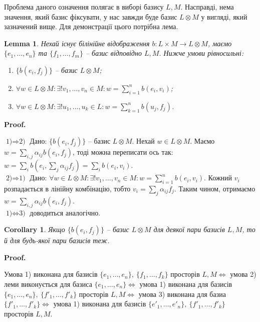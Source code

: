 \documentclass[a4paper, 10pt]{article}
\makeatletter
\theoremstyle{theoremdd}
\newtheorem{lemma}[theorem]{Lemma}
\newtheorem{corollary}[theorem]{Corollary}
\renewenvironment{proof}[1][Proof.\\]{\par
\pushQED{\hfill \qed}%
\normalfont \topsep6\p@\@plus6\p@\relax
\trivlist
\item\relax
{\bfseries
#1\@addpunct{.}}\hspace\labelsep\ignorespaces
}{%
\popQED\endtrivlist\@endpefalse
}
\makeatother
\begin{document}
\noindent
Проблема даного означення полягає в виборі базису $L,M$. Насправді, нема значення, який базис фіксувати, у нас завжди буде базис $L \otimes M$ у вигляді, який зазначений вище. Для демонстрації цього потрібна лема.

\begin{lemma}
Нехай існує білінійне відображення $b \colon L \times M \to L \otimes M$, маємо $\{e_1,\dots,e_n\}$ та $\{f_1,\dots,f_m\}$ -- базис відповідно $L,M$. Нижче умови рівносильні:
\begin{enumerate}[nosep,wide=0pt,label={\arabic*)}]
\item $\{b(e_i,f_j)\}$ -- базис $L \otimes M$;
\item $\forall w \in L \otimes M: \exists ! v_1,\dots,v_n \in M: w = \displaystyle\sum_{i=1}^n b(e_i,v_i)$;
\item $\forall w \in L \otimes M: \exists ! u_1,\dots,u_k \in L: w = \displaystyle\sum_{k=1}^n b(u_j,f_j)$.
\end{enumerate}
\end{lemma}

\begin{proof}
$\boxed{\text{1)} \Rightarrow \text{2)}}$ Дано: $\{b(e_i,f_j)\}$ -- базис $L \otimes M$. Нехай $w \in L \otimes M$. Маємо $w = \displaystyle\sum_{i,j} \alpha_{ij} b(e_i,f_j)$, тоді можна переписати ось так: $w = \displaystyle\sum_i b\left(e_i, \sum_j \alpha_{ij} f_j \right) = \sum_i b(e_i,v_i)$.
\bigskip \\
$\boxed{\text{2)} \Rightarrow \text{1)}}$ Дано: $\forall w \in L \otimes M: \exists ! v_1,\dots,v_n \in M: w = \displaystyle\sum_{i=1}^n b(e_i,v_i)$. Кожний $v_i$ розпадається в лінійну комбінацію, тобто $v_i = \displaystyle\sum_j \alpha_{ij} f_j$. Таким чином, отримаємо $w = \displaystyle\sum_{i,j} \alpha_{ij} b(e_i,f_j)$.
\bigskip \\
$\boxed{\text{1)} \iff \text{3)}}$ доводиться аналогічно.
\end{proof}

\begin{corollary}
Якщо $\{b(e_i,f_j)\}$ -- базис $L \otimes M$ для деякої пари базисів $L,M$, то й для будь-якої пари базисів теж.
\end{corollary}

\begin{proof}
Умова 1) виконана для базисів $\{e_1,\dots,e_n\},\ \{f_1,\dots,f_k\}$ просторів $L,M \iff$ умова 2) леми виконується для базиса $\{e_1,\dots,e_n\} \iff$ умова 1) виконана для базисів $\{e_1,\dots,e_n\},\ \{f'_1,\dots,f'_k\}$ просторів $L,M \iff$ умова 3) виконана для базиа $\{f'_1,\dots,f'_k\} \iff$ умова 1) виконана для базисів $\{e'_1,\dots,e'_n\},\ \{f'_1,\dots,f'_k\}$ просторів $L,M$.
\end{proof}
\end{document}

